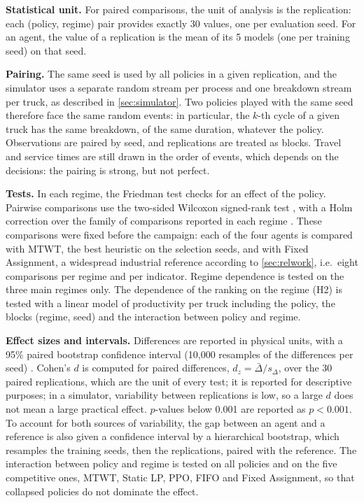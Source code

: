 \documentclass[11pt,a4paper]{article}
\newif\ifrevmarks
\newcommand{\revtag}[1]{\ifrevmarks\textsuperscript{\textcolor{red!70!black}{\scriptsize[#1]}}\fi}
\newcommand{\rev}[2]{\ifrevmarks{\color{revcolor}#2}\revtag{#1}\else#2\fi}
\newenvironment{revbloc}[1]{\par\ifrevmarks\color{revcolor}\noindent\revtag{#1}\ \fi}{\par}
\newif\ifcorrmarks
\newcommand{\corr}[1]{\ifcorrmarks\textcolor{corrcolor}{#1}\else#1\fi}
\begin{document}
\begin{revbloc}{M3, M4, M5, M6, M7, M22, v3}
\textbf{Statistical unit.} For paired comparisons, the unit of analysis is the replication: each (policy, regime) pair provides exactly 30 values, one per evaluation seed. For an agent, the value of a replication is the mean of its 5 models (one per training seed) on that seed.

\textbf{Pairing.} The same seed is used by all policies in a given replication, and the simulator uses a separate random stream per process and one breakdown stream per truck, as described in \cref{sec:simulator}. Two policies played with the same seed therefore face the same random events: in particular, the $k$-th cycle of a given truck has the same breakdown, of the same duration, whatever the policy. Observations are paired by seed, and replications are treated as blocks. Travel and service times are still drawn in the order of events, which depends on the decisions: the pairing is strong, but not perfect.

\textbf{Tests.} In each regime, the Friedman test \cite{Friedman1937} checks for an effect of the policy. Pairwise comparisons use the two-sided Wilcoxon signed-rank test \cite{Wilcoxon1945}, with a Holm correction \cite{Holm1979} over the family of comparisons reported in each regime \cite{Demsar2006}. \rev{v3}{These comparisons were fixed before the campaign: each of the four agents is compared with MTWT, the best heuristic on the selection seeds, and with Fixed Assignment, a widespread industrial reference according to \cref{sec:relwork}, i.e.\ eight comparisons per regime and per indicator. Regime dependence is tested on the three main regimes only.} The dependence of the ranking on the regime (H2) is tested with a linear model of productivity per truck including the policy, the blocks (regime, seed) and the interaction between policy and regime.

\textbf{Effect sizes and intervals.} Differences are reported in physical units, with a 95\% paired bootstrap confidence interval (10{,}000 resamples of the differences per seed) \cite{EfronTibshirani1993}. \corr{Cohen's $d$ is computed for paired differences, $d_z = \bar{\Delta}/s_{\Delta}$, over the 30 paired replications, which are the unit of every test;} it is reported for descriptive purposes; in a simulator, variability between replications is low, so a large $d$ does not mean a large practical effect. $p$-values below 0.001 are reported as $p<0.001$. \corr{To account for both sources of variability, the gap between an agent and a reference is also given a confidence interval by a hierarchical bootstrap, which resamples the training seeds, then the replications, paired with the reference. The interaction between policy and regime is tested on all policies and on the five competitive ones, MTWT, \corr{Static LP}, PPO, FIFO and Fixed Assignment, so that collapsed policies do not dominate the effect.}


\end{revbloc}
\end{document}
